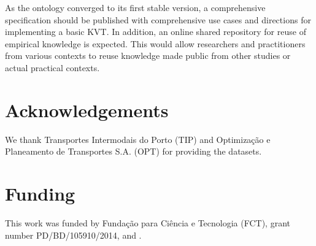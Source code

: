 \documentclass[]{interact}
\theoremstyle{plain}%
\theoremstyle{definition}
\theoremstyle{remark}
\theoremstyle{definition}
\begin{document}
As the ontology converged to its first stable version, a comprehensive specification should be published with comprehensive use cases and directions for implementing a basic KVT. In addition, an online shared repository for reuse of empirical knowledge is expected. This would allow researchers and practitioners from various contexts to reuse knowledge made public from other studies or actual practical contexts.

\section*{Acknowledgements}

 We thank Transportes Intermodais do Porto (TIP) and Optimiza\c{c}\~{a}o e Planeamento de Transportes S.A. (OPT) for providing the datasets.



\section*{Funding}

This work was funded by Funda\c{c}\~{a}o para Ci\^{e}ncia e Tecnologia (FCT), grant number PD/BD/105910/2014, and .




\end{document}
